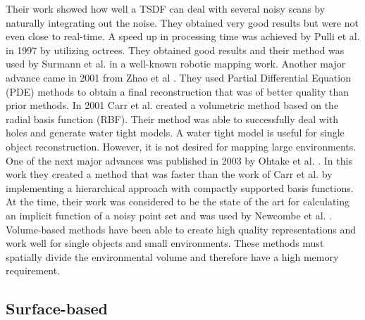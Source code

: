 Their work showed how well a TSDF can deal with several noisy scans by naturally
integrating out the noise. They obtained very good results but were not even
close to real-time. A speed up in processing time was achieved by Pulli et al.
in 1997 \cite{Pulli1997} by utilizing octrees. They obtained good results and
their method was used by Surmann et al. \cite{Surmann2003} in a well-known
robotic mapping work. Another major advance came in 2001 from Zhao et al
\cite{Zhao2001}. They used Partial Differential Equation (PDE) methods to obtain
a final reconstruction that was of better quality than prior methods. In 2001
Carr et al. \cite{Carr2001} created a volumetric method based on the radial
basis function (RBF). Their method was able to successfully deal with holes and
generate water tight models. A water tight model is useful for single object
reconstruction. However, it is not desired for mapping large environments. One
of the next major advances was published in 2003 by Ohtake et al.
\cite{Ohtake2003}. In this work they created a method that was faster than the
work of Carr et al. \cite{Carr2001} by implementing a hierarchical approach with
compactly supported basis functions. At the time, their work was considered to
be the state of the art for calculating an implicit function of a noisy point
set and was used by Newcombe et al. \cite{Newcombe2010}. Volume-based methods
have been able to create high quality representations and work well for single
objects and small environments. These methods must spatially divide the
environmental volume and therefore have a high memory requirement.

\subsection{Surface-based}

